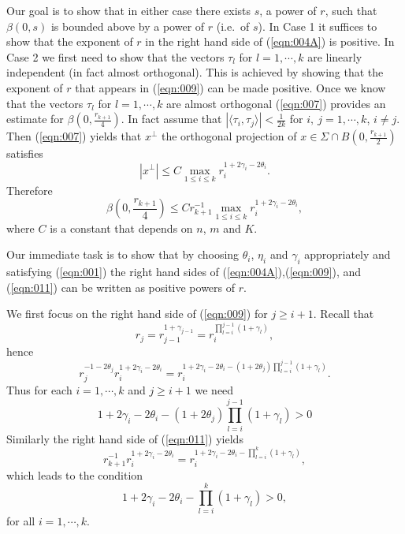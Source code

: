 \documentclass[12pt,leqno]{article}
\theoremstyle{plain}
\numberwithin{equation}{section}
\begin{document}
Our goal is to show that in either case there exists $s$, a power of $r$,
such that $\beta(0,s)$ is bounded above by a power of $r$ (i.e.\ of $s$).
In Case 1 it suffices to show that the exponent of $r$ in the right hand side
of (\ref{eqn:004A}) is positive. In Case 2 we first need to show that
the vectors $\tau_l$ for $l=1,\cdots, k$ are linearly independent
(in fact almost orthogonal). This is achieved by showing that the exponent
of $r$ that appears in (\ref{eqn:009}) can be made positive. Once we know that
the vectors $\tau_l$ for $l=1,\cdots, k$ are almost orthogonal
(\ref{eqn:007}) provides an estimate for $\beta(0,\frac{r_{k+1}}{4})$.
In fact assume that $|\langle\tau_i, \tau_{j}\rangle|<\frac{1}{2k}$ for
$i,\ j= 1,\cdots, k$, $i\not = j$. Then (\ref{eqn:007}) yields that
$x^{\perp}$ the orthogonal projection
of $x\in \Sigma\cap B(0,\frac{r_{k+1}}{2})$ satisfies
\begin{equation}\label{eqn:010}
|x^{\perp}|\le C\max_{1\le i\le k}r^{1+2\gamma_i-2\theta_i}_i.
\end{equation}
Therefore
\begin{equation}\label{eqn:011}
\beta(0,\frac{r_{k+1}}{4})\le C r_{k+1}^{-1}
\max_{1\le i\le k}r^{1+2\gamma_i-2\theta_i}_i,
\end{equation}
where $C$ is a constant that depends on $n$, $m$ and $K$.

Our immediate task is to show that by choosing $\theta_i$, $\eta_i$ and
$\gamma_i$ appropriately and satisfying (\ref{eqn:001}) the right
hand sides of (\ref{eqn:004A}),(\ref{eqn:009}), and (\ref{eqn:011})
can be written as positive powers of $r$.

We first focus on the right hand side of (\ref{eqn:009}) for $j\ge i+1$.
Recall that
\begin{equation}\label{eqn:012}
r_j=r^{1+\gamma_{j-1}}_{j-1} = r^{\prod^{j-1}_{l=i}(1+\gamma_l)}_i,
\end{equation}
hence
\begin{equation}\label{eqn:013}
r^{-1-2\theta_j}_j
r^{1+2\gamma_i-2\theta_i}_i =
r^{1+2\gamma_i-2\theta_i-(1+2\theta_j){\prod^{j-1}_{l=i}(1+\gamma_l)}}_i.
\end{equation}
Thus for each $i=1, \cdots, k$ and $j\ge i+1$ we need
\begin{equation}\label{eqn:014}
1+2\gamma_i-2\theta_i-(1+2\theta_j){\prod^{j-1}_{l=i}(1+\gamma_l)}>0
\end{equation}
Similarly the right hand side of (\ref{eqn:011}) yields
\begin{equation}\label{eqn:015}
r_{k+1}^{-1}
r^{1+2\gamma_i-2\theta_i}_i =
r_i^{1+2\gamma_i-2\theta_i- \prod^{k}_{l=i}(1+\gamma_l)},
\end{equation}
which leads to the condition
\begin{equation}\label{eqn:016}
1+2\gamma_i-2\theta_i- \prod^{k}_{l=i}(1+\gamma_l)>0,
\end{equation}
for all $i=1,\cdots, k$.
\end{document}
